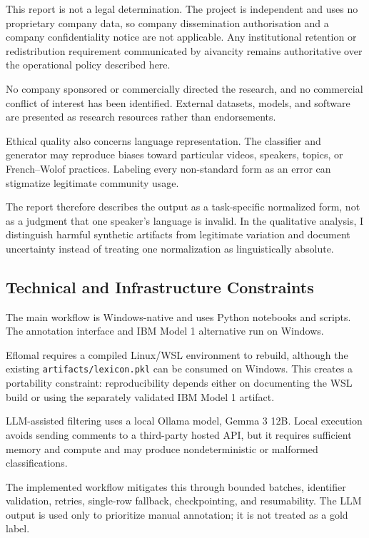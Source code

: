 \documentclass[12pt, a4paper, twoside, openany]{report}
\begin{document}
This report is not a legal determination. The project is independent and uses no proprietary company data, so company dissemination authorisation and a company confidentiality notice are not applicable. Any institutional retention or redistribution requirement communicated by aivancity remains authoritative over the operational policy described here.

No company sponsored or commercially directed the research, and no commercial conflict of interest has been identified. External datasets, models, and software are presented as research resources rather than endorsements.

Ethical quality also concerns language representation. The classifier and generator may reproduce biases toward particular videos, speakers, topics, or French--Wolof practices. Labeling every non-standard form as an error can stigmatize legitimate community usage.

The report therefore describes the output as a task-specific normalized form, not as a judgment that one speaker's language is invalid. In the qualitative analysis, I distinguish harmful synthetic artifacts from legitimate variation and document uncertainty instead of treating one normalization as linguistically absolute.


\subsection{Technical and Infrastructure Constraints}

The main workflow is Windows-native and uses Python notebooks and scripts. The annotation interface and IBM Model 1 alternative run on Windows.

Eflomal requires a compiled Linux/WSL environment to rebuild, although the existing \texttt{artifacts/lexicon.pkl} can be consumed on Windows. This creates a portability constraint: reproducibility depends either on documenting the WSL build or using the separately validated IBM Model 1 artifact.

LLM-assisted filtering uses a local Ollama model, Gemma 3 12B. Local execution avoids sending comments to a third-party hosted API, but it requires sufficient memory and compute and may produce nondeterministic or malformed classifications.

The implemented workflow mitigates this through bounded batches, identifier validation, retries, single-row fallback, checkpointing, and resumability. The LLM output is used only to prioritize manual annotation; it is not treated as a gold label.
\end{document}
